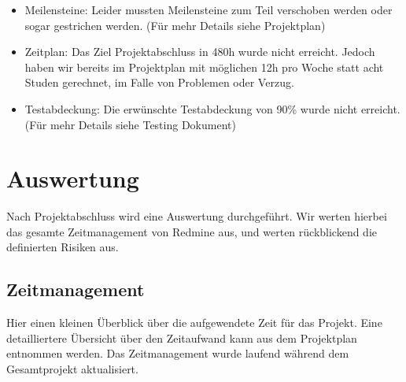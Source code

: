 \documentclass[a4,12pt]{scrartcl}
\begin{document}
\begin{itemize}
\item Meilensteine: Leider mussten Meilensteine zum Teil verschoben werden oder sogar gestrichen werden. (Für mehr Details siehe Projektplan) 
\item Zeitplan: Das Ziel Projektabschluss in 480h wurde nicht erreicht. Jedoch haben wir bereits im Projektplan mit möglichen 12h pro Woche statt acht Studen gerechnet, im Falle von Problemen oder Verzug.
\item Testabdeckung: Die erwünschte Testabdeckung von 90\% wurde nicht erreicht. (Für mehr Details siehe Testing Dokument) 
\end{itemize}
\newpage

\section{Auswertung}
Nach Projektabschluss wird eine Auswertung durchgeführt. Wir werten hierbei das gesamte Zeitmanagement von Redmine aus, und werten rückblickend die definierten Risiken aus. 

\subsection{Zeitmanagement}
Hier einen kleinen Überblick über die aufgewendete Zeit für das Projekt. Eine detailliertere Übersicht über den Zeitaufwand kann aus dem Projektplan entnommen werden. Das Zeitmanagement wurde laufend während dem Gesamtprojekt aktualisiert. 
\end{document}
